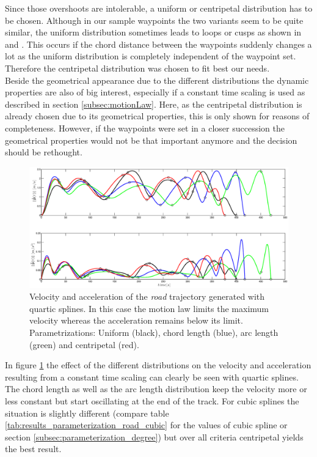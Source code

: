 Since those overshoots are intolerable, a uniform or centripetal distribution has to be chosen. Although in our sample waypoints the two variants seem to be quite similar, the uniform distribution sometimes leads to  loops or cusps as shown in \cite{lee} and \cite{haron}. This occurs if the chord distance between the waypoints suddenly changes a lot as the uniform distribution is completely independent of the waypoint set. Therefore the centripetal distribution was chosen to fit best our needs.
\\
Beside the geometrical appearance due to the different distributions the dynamic properties are also of big interest, especially if a constant time scaling is used as described in section \ref{subsec:motionLaw}. Here, as the centripetal distribution is already chosen due to its geometrical properties, this is only shown for reasons of completeness. However, if the waypoints were set in a closer succession the geometrical properties would not be that important anymore and the decision should be rethought.

\begin{figure}[H]
	\centering
    \includegraphics[width = \textwidth]{graphics/Parameterization4_road_vel_acc.eps}
  \caption{Velocity and acceleration of the \textit{road} trajectory generated with quartic splines. In this case the motion law limits the maximum velocity whereas the acceleration remains below its limit. Parametrizations: Uniform (black), chord length (blue), arc length (green) and centripetal (red).}
  \label{fig:para road vel acc}
\end{figure}

In figure \ref{fig:para road vel acc} the effect of the different distributions on the velocity and acceleration resulting from a constant time scaling can clearly be seen with quartic splines. The chord length as well as the arc length distribution keep the velocity more or less constant but start oscillating at the end of the track. For cubic splines the situation is slightly different (compare table \ref{tab:results_parameterization_road_cubic} for the values of cubic spline or section \ref{subsec:parameterization_degree}) but over all criteria centripetal yields the best result.


